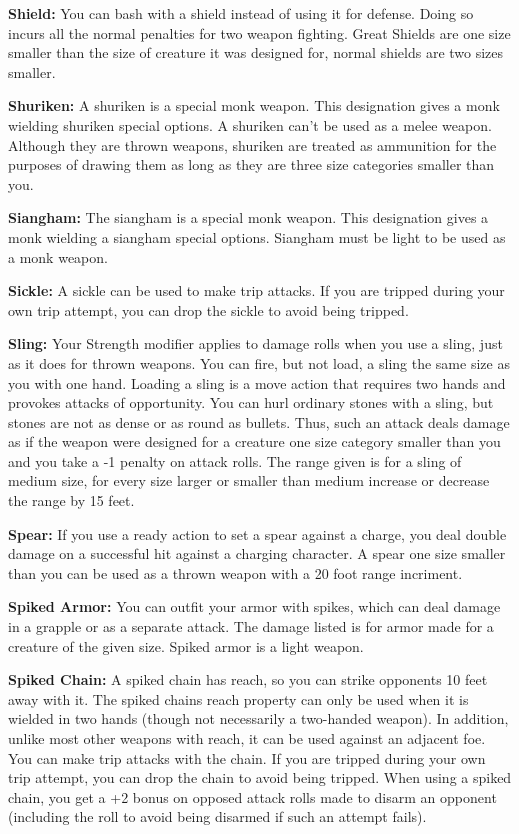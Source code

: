 \textbf{Shield:} You can bash with a shield instead of using it for defense. Doing so incurs all the normal penalties for two weapon fighting. Great Shields are one size smaller than the size of creature it was designed for, normal shields are two sizes smaller.

\textbf{Shuriken:} A shuriken is a special monk weapon. This designation gives a monk wielding shuriken special options. A shuriken can't be used as a melee weapon. Although they are thrown weapons, shuriken are treated as ammunition for the purposes of drawing them as long as they are three size categories smaller than you.

\textbf{Siangham:} The siangham is a special monk weapon. This designation gives a monk wielding a siangham special options. Siangham must be light to be used as a monk weapon.

\textbf{Sickle:} A sickle can be used to make trip attacks. If you are tripped during your own trip attempt, you can drop the sickle to avoid being tripped.

\textbf{Sling:} Your Strength modifier applies to damage rolls when you use a sling, just as it does for thrown weapons. You can fire, but not load, a sling the same size as you with one hand. Loading a sling is a move action that requires two hands and provokes attacks of opportunity. You can hurl ordinary stones with a sling, but stones are not as dense or as round as bullets. Thus, such an attack deals damage as if the weapon were designed for a creature one size category smaller than you and you take a -1 penalty on attack rolls. The range given is for a sling of medium size, for every size larger or smaller than medium increase or decrease the range by 15 feet.

\textbf{Spear:} If you use a ready action to set a spear against a charge, you deal double damage on a successful hit against a charging character. A spear one size smaller than you can be used as a thrown weapon with a 20 foot range incriment.

\textbf{Spiked Armor:} You can outfit your armor with spikes, which can deal damage in a grapple or as a separate attack. The damage listed is for armor made for a creature of the given size. Spiked armor is a light weapon.

\textbf{Spiked Chain:} A spiked chain has reach, so you can strike opponents 10 feet away with it. The spiked chains reach property can only be used when it is wielded in two hands (though not necessarily a two-handed weapon). In addition, unlike most other weapons with reach, it can be used against an adjacent foe. You can make trip attacks with the chain. If you are tripped during your own trip attempt, you can drop the chain to avoid being tripped. When using a spiked chain, you get a +2 bonus on opposed attack rolls made to disarm an opponent (including the roll to avoid being disarmed if such an attempt fails).

